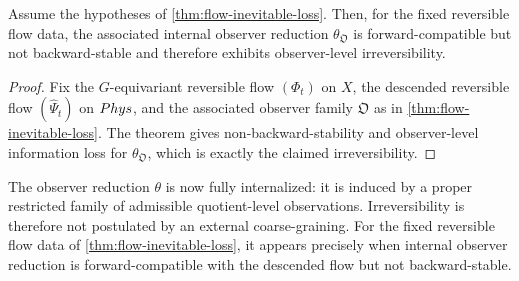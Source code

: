 \begin{corollary}
	\label{cor:flow-irreversibility-forced}
	Assume the hypotheses of \cref{thm:flow-inevitable-loss}. Then, for the
	fixed reversible flow data, the associated internal observer reduction
	\(\theta_{\mathfrak O}\) is forward-compatible but not backward-stable
	and therefore exhibits observer-level irreversibility.
\end{corollary}
\begin{proof}
	Fix the \(G\)-equivariant reversible flow \((\Phi_t)\) on \(X\), the
	descended reversible flow \((\widehat\Psi_t)\) on \(Phys\), and the
	associated observer family \(\mathfrak O\) as in
	\cref{thm:flow-inevitable-loss}. The theorem gives non-backward-stability
	and observer-level information loss for \(\theta_{\mathfrak O}\), which
	is exactly the claimed irreversibility.
\end{proof}
\begin{remark}
	The observer reduction \(\theta\) is now fully internalized: it is
	induced by a proper restricted family of admissible quotient-level
	observations. Irreversibility is therefore not postulated by an
	external coarse-graining. For the fixed reversible flow data of
	\cref{thm:flow-inevitable-loss}, it appears precisely when internal
	observer reduction is forward-compatible with the descended flow but not
	backward-stable.
\end{remark}
